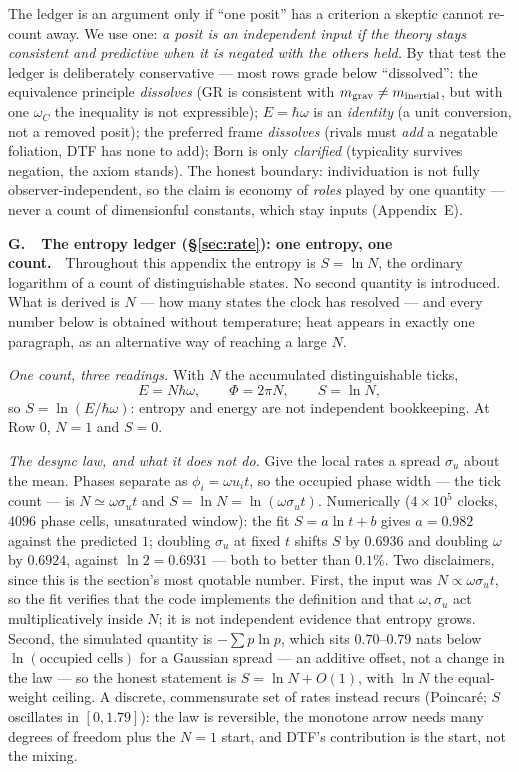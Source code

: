 \documentclass[11pt]{article}
\begin{document}
\noindent The ledger is an argument only if ``one posit'' has a criterion a skeptic cannot re-count away. We use
one: \emph{a posit is an independent input if the theory stays consistent and predictive when it is negated with
the others held.} By that test the ledger is deliberately conservative --- most rows grade below ``dissolved'':
the equivalence principle \emph{dissolves} (GR is consistent with $m_{\rm grav}\neq m_{\rm inertial}$, but with
one $\omega_C$ the inequality is not expressible); $E=\hbar\omega$ is an \emph{identity} (a unit conversion, not
a removed posit); the preferred frame \emph{dissolves} (rivals must \emph{add} a negatable foliation, DTF has
none to add); Born is only \emph{clarified} (typicality survives negation, the axiom stands). The honest
boundary: individuation is not fully observer-independent, so the claim is economy of \emph{roles} played by one
quantity --- never a count of dimensionful constants, which stay inputs (Appendix~E).

\medskip
\noindent\textbf{G.\ \ The entropy ledger (\S\ref{sec:rate}): one entropy, one count.}\ \
Throughout this appendix the entropy is $S=\ln N$, the ordinary logarithm of a count of distinguishable
states. No second quantity is introduced. What is derived is $N$ --- how many states the clock has resolved ---
and every number below is obtained without temperature; heat appears in exactly one paragraph, as an
alternative way of reaching a large $N$.

\emph{One count, three readings.} With $N$ the accumulated distinguishable ticks,
\[
E=N\hbar\omega,\qquad \Phi=2\pi N,\qquad S=\ln N ,
\]
so $S=\ln(E/\hbar\omega)$: entropy and energy are not independent bookkeeping. At Row 0, $N=1$ and $S=0$.

\emph{The desync law, and what it does not do.} Give the local rates a spread $\sigma_u$ about the mean.
Phases separate as $\phi_i=\omega u_i t$, so the occupied phase width --- the tick count --- is
$N\simeq\omega\sigma_u t$ and $S=\ln N=\ln(\omega\sigma_u t)$. Numerically ($4\times10^{5}$ clocks, $4096$
phase cells, unsaturated window): the fit $S=a\ln t+b$ gives $a=0.982$ against the predicted $1$; doubling
$\sigma_u$ at fixed $t$ shifts $S$ by $0.6936$ and doubling $\omega$ by $0.6924$, against $\ln2=0.6931$ ---
both to better than $0.1\%$. Two disclaimers, since this is the section's most quotable number. First, the
input was $N\propto\omega\sigma_u t$, so the fit verifies that the code implements the definition and that
$\omega,\sigma_u$ act multiplicatively inside $N$; it is not independent evidence that entropy grows.
Second, the simulated quantity is $-\sum p\ln p$, which sits $0.70$--$0.79$ nats below $\ln(\text{occupied
cells})$ for a Gaussian spread --- an additive offset, not a change in the law --- so the honest statement is
$S=\ln N+O(1)$, with $\ln N$ the equal-weight ceiling. A discrete, commensurate set of rates instead recurs
(Poincar\'e; $S$ oscillates in $[0,1.79]$): the law is reversible, the monotone arrow needs many degrees of
freedom plus the $N=1$ start, and DTF's contribution is the start, not the mixing.
\end{document}
